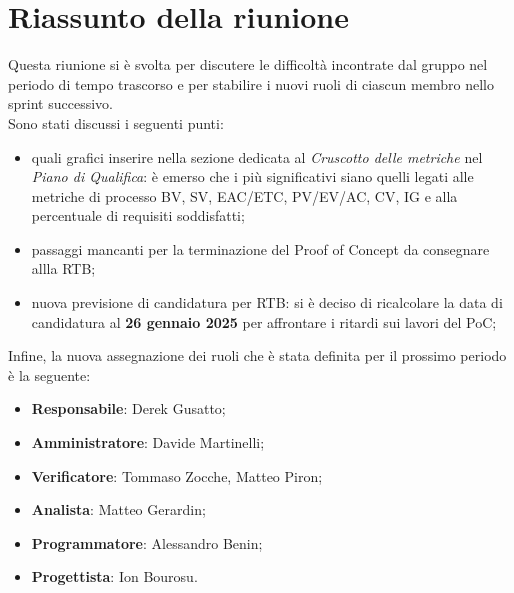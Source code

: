 \section{Riassunto della riunione}
Questa riunione si è svolta per discutere le difficoltà incontrate dal gruppo nel periodo di tempo trascorso e per stabilire i nuovi ruoli di ciascun membro nello sprint successivo.\\
Sono stati discussi i seguenti punti:
\begin{itemize}
    \item quali grafici inserire nella sezione dedicata al \textit{Cruscotto delle metriche} nel \textit{Piano di Qualifica}: è emerso che i più significativi siano quelli legati alle metriche di processo BV, SV, EAC/ETC, PV/EV/AC, CV, IG e alla percentuale di requisiti soddisfatti;
    \item passaggi mancanti per la terminazione del Proof of Concept da consegnare allla RTB;
    \item nuova previsione di candidatura per RTB: si è deciso di ricalcolare la data di candidatura al \textbf{26 gennaio 2025} per affrontare i ritardi sui lavori del PoC;
\end{itemize}
Infine, la nuova assegnazione dei ruoli che è stata definita per il prossimo periodo è la seguente:
 \begin{itemize}
    \item \textbf{Responsabile}: Derek Gusatto;
    \item \textbf{Amministratore}: Davide Martinelli;
    \item \textbf{Verificatore}: Tommaso Zocche, Matteo Piron;
    \item \textbf{Analista}: Matteo Gerardin;
    \item \textbf{Programmatore}: Alessandro Benin;
    \item \textbf{Progettista}: Ion Bourosu.
\end{itemize}